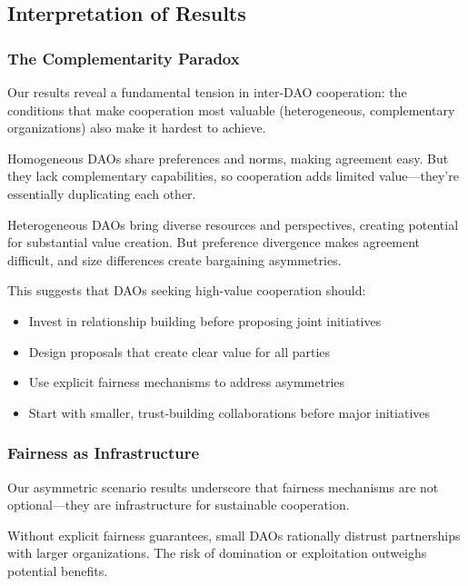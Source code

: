 
\subsection{Interpretation of Results}

\subsubsection{The Complementarity Paradox}

Our results reveal a fundamental tension in inter-DAO cooperation: the conditions that make cooperation most valuable (heterogeneous, complementary organizations) also make it hardest to achieve.

Homogeneous DAOs share preferences and norms, making agreement easy. But they lack complementary capabilities, so cooperation adds limited value---they're essentially duplicating each other.

Heterogeneous DAOs bring diverse resources and perspectives, creating potential for substantial value creation. But preference divergence makes agreement difficult, and size differences create bargaining asymmetries.

This suggests that DAOs seeking high-value cooperation should:
\begin{itemize}
    \item Invest in relationship building before proposing joint initiatives
    \item Design proposals that create clear value for all parties
    \item Use explicit fairness mechanisms to address asymmetries
    \item Start with smaller, trust-building collaborations before major initiatives
\end{itemize}

\subsubsection{Fairness as Infrastructure}

Our asymmetric scenario results underscore that fairness mechanisms are not optional---they are infrastructure for sustainable cooperation.

Without explicit fairness guarantees, small DAOs rationally distrust partnerships with larger organizations. The risk of domination or exploitation outweighs potential benefits.

